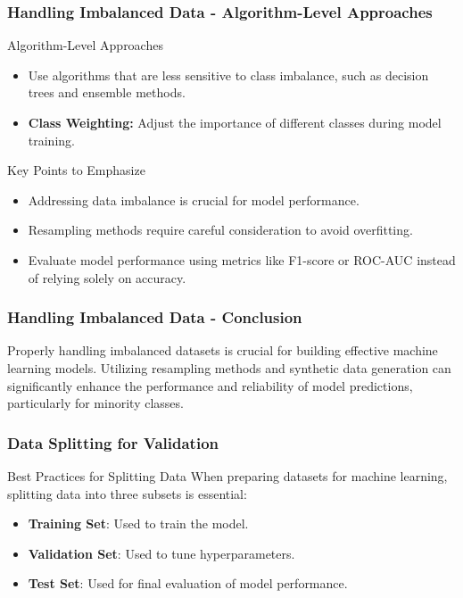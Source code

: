 \documentclass[aspectratio=169]{beamer}
\begin{document}
\begin{frame}[fragile]
    \frametitle{Handling Imbalanced Data - Algorithm-Level Approaches}
    \begin{block}{Algorithm-Level Approaches}
        \begin{itemize}
            \item Use algorithms that are less sensitive to class imbalance, such as decision trees and ensemble methods.
            \item \textbf{Class Weighting:} Adjust the importance of different classes during model training.
        \end{itemize}
    \end{block}
    \begin{block}{Key Points to Emphasize}
        \begin{itemize}
            \item Addressing data imbalance is crucial for model performance.
            \item Resampling methods require careful consideration to avoid overfitting.
            \item Evaluate model performance using metrics like F1-score or ROC-AUC instead of relying solely on accuracy.
        \end{itemize}
    \end{block}
\end{frame}

\begin{frame}[fragile]
    \frametitle{Handling Imbalanced Data - Conclusion}
    Properly handling imbalanced datasets is crucial for building effective machine learning models. 
    Utilizing resampling methods and synthetic data generation can significantly enhance the performance and reliability of model predictions, particularly for minority classes.
\end{frame}

\begin{frame}[fragile]
    \frametitle{Data Splitting for Validation}
    \begin{block}{Best Practices for Splitting Data}
        When preparing datasets for machine learning, splitting data into three subsets is essential:
        \begin{itemize}
            \item \textbf{Training Set}: Used to train the model.
            \item \textbf{Validation Set}: Used to tune hyperparameters.
            \item \textbf{Test Set}: Used for final evaluation of model performance.
        \end{itemize}
    \end{block}
\end{frame}
\end{document}
